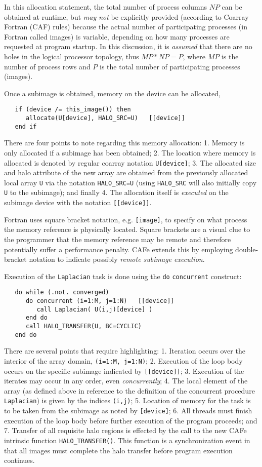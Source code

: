 In this allocation statement, the total number of process columns $NP$ can be obtained at runtime,
but \emph{may not} be explicitly provided (according to Coarray Fortran (CAF) rules) because the actual number of
participating processes (in Fortran called images) is variable, depending on how many processes are
requested at program startup.  In this discussion, it is \emph{assumed} that there are no holes in
the logical processor topology, thus $MP*NP = P$, where $MP$ is the number of process rows and $P$
is the total number of participating processes (images).

Once a subimage is obtained, memory on the device can be allocated,
\begin{verbatim}
   if (device /= this_image()) then
      allocate(U[device], HALO_SRC=U)   [[device]]
   end if
\end{verbatim}
There are four points to note regarding this memory allocation: 1. Memory is only allocated if a
subimage has been obtained; 2. The location where memory is allocated is denoted by regular coarray
notation \texttt{U[device]}; 3. The allocated size and halo attribute of the new array are obtained
from the previously allocated local array \texttt{U} via the notation \texttt{HALO\_SRC=U} (using
\texttt{HALO\_SRC} will also initially copy \texttt{U} to the subimage); and finally 4. The
allocation itself is \emph{executed} on the subimage device with the notation \texttt{[[device]]}.

Fortran uses square bracket notation, e.g. \texttt{[image]}, to specify on what process the
memory reference is physically located.  Square brackets are a visual clue to the
programmer that the memory reference may be remote and therefore potentially suffer a
performance penalty.  CAFe extends this by employing double-bracket notation to indicate
possibly \emph{remote subimage execution}.

Execution of the \texttt{Laplacian} task is done using the \texttt{do}
\texttt{concurrent} construct:
\begin{verbatim}
   do while (.not. converged)
      do concurrent (i=1:M, j=1:N)   [[device]]
         call Laplacian( U(i,j)[device] )
      end do
      call HALO_TRANSFER(U, BC=CYCLIC)
   end do
\end{verbatim}
There are several points that require highlighting: 1. Iteration occurs over the interior
of the array domain, \texttt{(i=1:M, j=1:N)}; 2. Execution of the loop body occurs on the
specific subimage indicated by \texttt{[[device]]}; 3. Execution of the iterates may occur
in any order, even \emph{concurrently}; 4. The local element of the array (as
defined above in reference to the definition of the concurrent procedure
\texttt{Laplacian}) is given by the indices \texttt{(i,j)}; 5. Location of memory for the
task is to be taken from the subimage as noted by \texttt{[device]}; 6. All threads must finish
execution of the loop body before further execution of the program proceeds; and 7. Transfer of
all requisite halo regions is effected by the call to the new CAFe intrinsic function
\texttt{HALO\_TRANSFER()}.  This function is a synchronization event in that all images must
complete the halo transfer before program execution continues.


